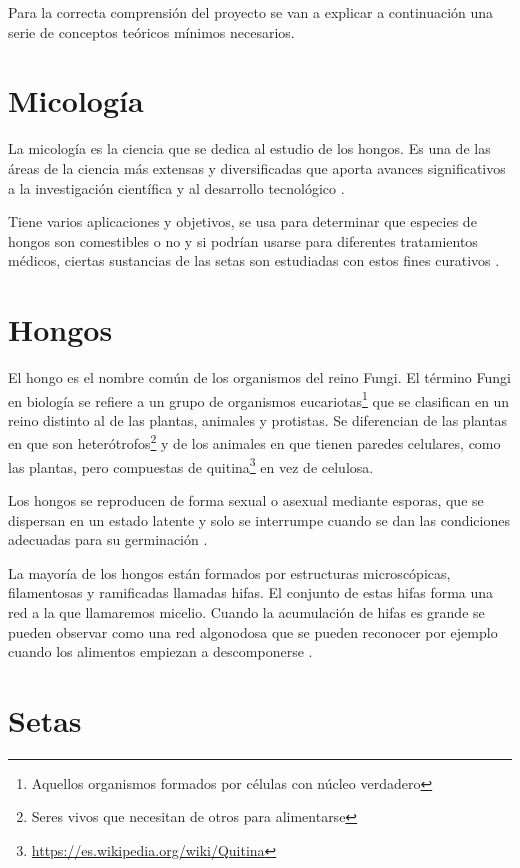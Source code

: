 
Para la correcta comprensión del proyecto se van a explicar a continuación una serie de conceptos teóricos mínimos necesarios.

\section{Micología}

La micología es la ciencia que se dedica al estudio de los hongos. Es una de las áreas de la ciencia más extensas y diversificadas que aporta avances significativos a la investigación científica y al desarrollo tecnológico \cite{wiki:micologia}.

Tiene varios aplicaciones y objetivos, se usa para determinar que especies de hongos son comestibles o no y si podrían usarse para diferentes tratamientos médicos, ciertas sustancias de las setas son estudiadas con estos fines curativos \cite{micologiaDef}. 

\section{Hongos}

El hongo es el nombre común de los organismos del reino Fungi. El término Fungi en biología se refiere a un grupo de organismos eucariotas\footnote{Aquellos organismos formados por células con núcleo verdadero} que se clasifican en un reino distinto al de las plantas, animales y protistas. Se diferencian de las plantas en que son heterótrofos\footnote{Seres vivos que necesitan de otros para alimentarse} y de los animales en que tienen paredes celulares, como las plantas, pero compuestas de quitina\footnote{\url{https://es.wikipedia.org/wiki/Quitina}} en vez de celulosa.

Los hongos se reproducen de forma sexual o asexual mediante esporas, que se dispersan en un estado latente y solo se interrumpe cuando se dan las condiciones adecuadas para su germinación \cite{wiki:fungi}. 

La mayoría de los hongos están formados por estructuras microscópicas, filamentosas y ramificadas llamadas hifas. El conjunto de estas hifas forma una red a la que llamaremos micelio. Cuando la acumulación de hifas es grande se pueden observar como una red algonodosa que se pueden reconocer por ejemplo cuando los alimentos empiezan a descomponerse \cite{setas}.

\section{Setas}

